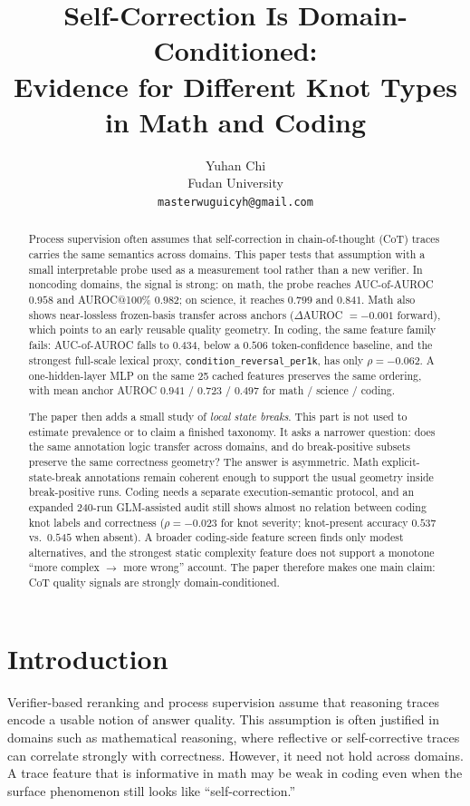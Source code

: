 \documentclass[10pt]{article}
\title{\textbf{Self-Correction Is Domain-Conditioned:}\\
\large Evidence for Different Knot Types in Math and Coding}
\author{Yuhan Chi\\Fudan University\\\texttt{masterwuguicyh@gmail.com}}
\date{}
\begin{document}
\maketitle

\begin{abstract}
Process supervision often assumes that self-correction in chain-of-thought (CoT) traces carries the same semantics across domains. This paper tests that assumption with a small interpretable probe used as a measurement tool rather than a new verifier. In noncoding domains, the signal is strong: on math, the probe reaches AUC-of-AUROC $0.958$ and AUROC@100\% $0.982$; on science, it reaches $0.799$ and $0.841$. Math also shows near-lossless frozen-basis transfer across anchors ($\Delta$AUROC $=-0.001$ forward), which points to an early reusable quality geometry. In coding, the same feature family fails: AUC-of-AUROC falls to $0.434$, below a $0.506$ token-confidence baseline, and the strongest full-scale lexical proxy, \texttt{condition\_reversal\_per1k}, has only $\rho=-0.062$. A one-hidden-layer MLP on the same 25 cached features preserves the same ordering, with mean anchor AUROC $0.941$ / $0.723$ / $0.497$ for math / science / coding.

The paper then adds a small study of \emph{local state breaks}. This part is not used to estimate prevalence or to claim a finished taxonomy. It asks a narrower question: does the same annotation logic transfer across domains, and do break-positive subsets preserve the same correctness geometry? The answer is asymmetric. Math explicit-state-break annotations remain coherent enough to support the usual geometry inside break-positive runs. Coding needs a separate execution-semantic protocol, and an expanded 240-run GLM-assisted audit still shows almost no relation between coding knot labels and correctness ($\rho=-0.023$ for knot severity; knot-present accuracy $0.537$ vs.\ $0.545$ when absent). A broader coding-side feature screen finds only modest alternatives, and the strongest static complexity feature does not support a monotone ``more complex $\rightarrow$ more wrong'' account. The paper therefore makes one main claim: CoT quality signals are strongly domain-conditioned.
\end{abstract}

\section{Introduction}

Verifier-based reranking and process supervision assume that reasoning traces encode a usable notion of answer quality. This assumption is often justified in domains such as mathematical reasoning, where reflective or self-corrective traces can correlate strongly with correctness. However, it need not hold across domains. A trace feature that is informative in math may be weak in coding even when the surface phenomenon still looks like ``self-correction.''
\end{document}
